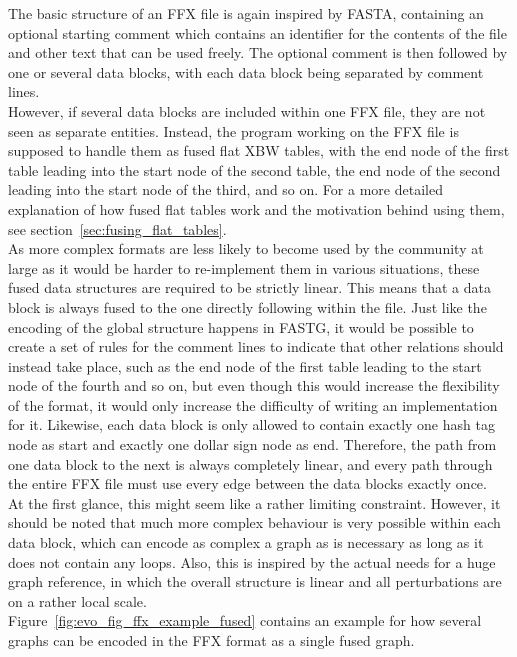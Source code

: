 \documentclass[a4paper,12pt,twoside,BCOR=10mm]{scrbook}
\begin{document}
The basic structure of an FFX file is again inspired by FASTA, 
containing an optional starting comment which contains an identifier for 
the contents of the file and other text that can be used freely. 
The optional comment is then followed by one or several data blocks, 
with each data block being separated by comment lines. \\
However, if several data blocks are included within one FFX file, 
they are not seen as separate entities. Instead, the program working on 
the FFX file is supposed to handle them as fused flat XBW tables, 
with the end node of the first table leading into the start node of the 
second table, the end node of the second leading into the start node of the 
third, and so on. 
For a more detailed explanation of how fused 
flat tables work and the motivation behind using them, 
see section~\ref{sec:fusing_flat_tables}. \\
As more complex formats are less likely to become 
used by the community at large as it would be harder to re-implement them 
in various situations, these fused data structures are required to be strictly linear. 
This means that a data block is always fused to the one directly following 
within the file. 
Just like the encoding of the global structure happens in FASTG, 
it would be possible to create a set of rules for the comment 
lines to indicate that other relations should instead take place, such as the 
end node of the first table leading to the start node of the fourth and so on, 
but even though this would increase the flexibility of the format, it would only 
increase the difficulty of writing an implementation for it. 
Likewise, each data block is only allowed to contain exactly one hash tag node 
as start and exactly one dollar sign node as end. Therefore, the path from one 
data block to the next is always completely linear, and every path through the 
entire FFX file must use every edge between the data blocks exactly once. \\
At the first glance, this might seem like a rather limiting constraint. 
However, it should be noted that much more complex behaviour is very possible 
within each data block, which can encode as complex a graph as is necessary 
as long as it does not contain any loops. 
Also, this is inspired by the actual needs for a huge graph reference, 
in which the overall structure is linear and all perturbations are on a 
rather local scale. \\
Figure~\ref{fig:evo_fig_ffx_example_fused} contains an example for 
how several graphs can be encoded in the FFX format as a single fused graph. 
\end{document}
